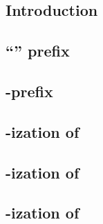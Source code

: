 \subsection{Introduction                      \lispTodo{}}  \label{rlp auth: rlp utils calls: intro}    
\subsection{``\locMagicByte'' prefix          \lispTodo{}}  \label{rlp auth: rlp utils calls: magic}    
\subsection{\rlp{}-prefix                     \lispTodo{}}  \label{rlp auth: rlp utils calls: prefix}   
\subsection{\rlp{}-ization of \locChainId{}   \lispTodo{}}  \label{rlp auth: rlp utils calls: chain id} 
\subsection{\rlp{}-ization of \locAddress{}   \lispTodo{}}  \label{rlp auth: rlp utils calls: address}  
\subsection{\rlp{}-ization of \locNonce{}     \lispTodo{}}  \label{rlp auth: rlp utils calls: nonce}    
